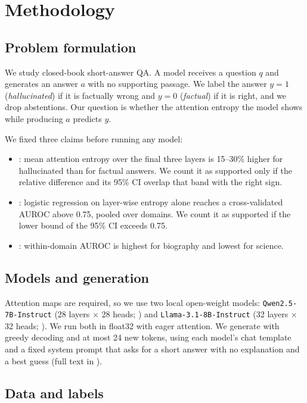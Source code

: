 \section{Methodology}
\label{sec:method}

\subsection{Problem formulation}

We study closed-book short-answer QA.
A model receives a question $q$ and generates an answer $a$ with no supporting passage.
We label the answer $y=1$ (\emph{hallucinated}) if it is factually wrong and $y=0$ (\emph{factual}) if it is right, and we drop abstentions.
Our question is whether the attention entropy the model shows while producing $a$ predicts $y$.

 We fixed three claims before running any model:
\begin{itemize}[leftmargin=*,itemsep=0pt,topsep=0pt]
    \item \Hone: mean attention entropy over the final three layers is 15--30\% higher for hallucinated than for factual answers. We count it as supported only if the relative difference and its 95\% CI overlap that band with the right sign.
    \item \Htwo: logistic regression on layer-wise entropy alone reaches a cross-validated AUROC above 0.75, pooled over domains. We count it as supported if the lower bound of the 95\% CI exceeds 0.75.
    \item \Hthree: within-domain AUROC is highest for biography and lowest for science.
\end{itemize}

\subsection{Models and generation}

Attention maps are required, so we use two local open-weight models: \texttt{Qwen2.5-7B-Instruct} (28 layers $\times$ 28 heads; \qwen) and \texttt{Llama-3.1-8B-Instruct} (32 layers $\times$ 32 heads; \llama).
We run both in float32 with eager attention.
We generate with greedy decoding and at most 24 new tokens, using each model's chat template and a fixed system prompt that asks for a short answer with no explanation and a best guess (full text in ).

\subsection{Data and labels}

